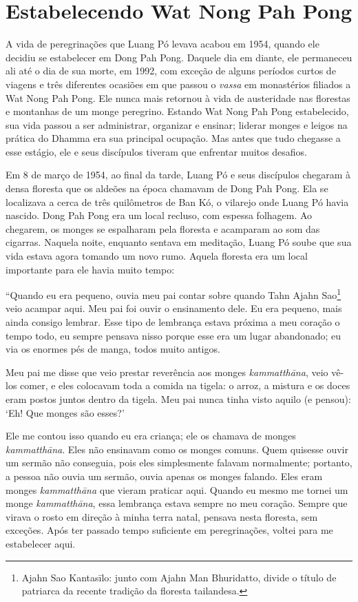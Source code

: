 \chapter{Estabelecendo Wat Nong Pah Pong}

A vida de peregrinações que Luang Pó levava acabou em 1954, quando ele
decidiu se estabelecer em Dong Pah Pong. Daquele dia em diante, ele
permaneceu ali até o dia de sua morte, em 1992, com exceção de alguns
períodos curtos de viagens e três diferentes ocasiões em que passou o
\emph{vassa} em monastérios filiados a Wat Nong Pah Pong. Ele nunca mais
retornou à vida de austeridade nas florestas e montanhas de um monge
peregrino. Estando Wat Nong Pah Pong estabelecido, sua vida passou a ser
administrar, organizar e ensinar; liderar monges e leigos na prática do
Dhamma era sua principal ocupação. Mas antes que tudo chegasse a esse
estágio, ele e seus discípulos tiveram que enfrentar muitos desafios.

Em 8 de março de 1954, ao final da tarde, Luang Pó e seus discípulos
chegaram à densa floresta que os aldeões na época chamavam de Dong Pah
Pong. Ela se localizava a cerca de três quilômetros de Ban Kó, o
vilarejo onde Luang Pó havia nascido. Dong Pah Pong era um local
recluso, com espessa folhagem. Ao chegarem, os monges se espalharam pela
floresta e acamparam ao som das cigarras. Naquela noite, enquanto
sentava em meditação, Luang Pó soube que sua vida estava agora tomando
um novo rumo. Aquela floresta era um local importante para ele havia
muito tempo:

``Quando eu era pequeno, ouvia meu pai contar sobre quando Tahn Ajahn
Sao\footnote{Ajahn Sao Kantasīlo: junto com Ajahn Man Bhuridatto, divide
  o título de patriarca da recente tradição da floresta tailandesa.}
veio acampar aqui. Meu pai foi ouvir o ensinamento dele. Eu era pequeno,
mais ainda consigo lembrar. Esse tipo de lembrança estava próxima a meu
coração o tempo todo, eu sempre pensava nisso porque esse era um lugar
abandonado; eu via os enormes pés de manga, todos muito antigos.

Meu pai me disse que veio prestar reverência aos monges
\emph{kammatthāna}, veio vê-los comer, e eles colocavam toda a comida na
tigela: o arroz, a mistura e os doces eram postos juntos dentro da
tigela. Meu pai nunca tinha visto aquilo (e pensou): `Eh! Que monges são
esses?'

Ele me contou isso quando eu era criança; ele os chamava de monges
\emph{kammatthāna}. Eles não ensinavam como os monges comuns. Quem
quisesse ouvir um sermão não conseguia, pois eles simplesmente falavam
normalmente; portanto, a pessoa não ouvia um sermão, ouvia apenas os
monges falando. Eles eram monges \emph{kammatthāna} que vieram praticar
aqui. Quando eu mesmo me tornei um monge \emph{kammatthāna}, essa
lembrança estava sempre no meu coração. Sempre que virava o rosto em
direção à minha terra natal, pensava nesta floresta, sem exceções. Após
ter passado tempo suficiente em peregrinações, voltei para me
estabelecer aqui.

